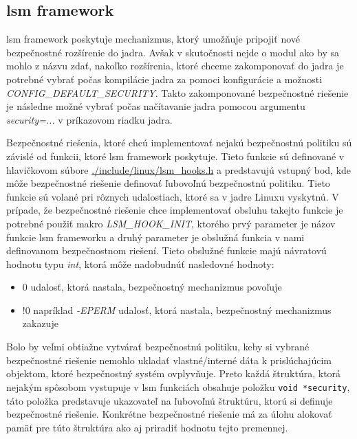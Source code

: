 \subsection{\acrshort{lsm} framework} \label{lsm}
\acrfull{lsm} framework poskytuje mechanizmus, ktorý umožňuje pripojiť nové bezpečnostné rozšírenie do jadra. Avšak v skutočnosti nejde o modul ako by sa mohlo z názvu zdať, nakoľko rozšírenia, ktoré chceme zakomponovať do jadra je potrebné vybrať počas kompilácie jadra za pomoci konfigurácie a možnosti \textit{CONFIG\_DEFAULT\_SECURITY}. Takto zakomponované bezpečnostné riešenie je následne možné vybrať počas načítavanie jadra pomocou argumentu \textit{security=...} v príkazovom riadku jadra.\cite{lsm}

Bezpečnostné riešenia, ktoré chcú implementovať nejakú bezpečnostnú politiku sú závislé od funkcii, ktoré \acrshort{lsm} framework poskytuje. Tieto funkcie sú definované v hlavičkovom súbore \url{./include/linux/lsm_hooks.h} a predstavujú vstupný bod, kde môže bezpečnostné riešenie definovať ľubovoľnú bezpečnostnú politiku. Tieto funkcie sú volané pri rôznych udalostiach, ktoré sa v jadre Linuxu vyskytnú. V prípade, že bezpečnostné riešenie chce implementovať obsluhu takejto funkcie je potrebné použiť makro \textit{LSM\_HOOK\_INIT}, ktorého prvý parameter je názov funkcie \acrshort{lsm} frameworku a druhý parameter je obslužná funkcia v nami definovanom bezpečnostnom riešení.\cite{medusavilo} Tieto obslužné funkcie majú návratovú hodnotu typu \textit{int}, ktorá môže nadobudnúť nasledovné hodnoty:
\begin{itemize}
\item 0 udalosť, ktorá nastala, bezpečnostný mechanizmus povoľuje
\item !0 napríklad \textit{-EPERM} udalosť, ktorá nastala, bezpečnostný mechanizmus zakazuje
\end{itemize}

Bolo by veľmi obtiažne vytvárať bezpečnostnú politiku, keby si vybrané bezpečnostné riešenie nemohlo ukladať vlastné/interné dáta k prislúchajúcim objektom, ktoré bezpečnostný systém ovplyvňuje. Preto každá štruktúra, ktorá nejakým spôsobom vystupuje v \acrshort{lsm} funkciách obsahuje položku \texttt{void *security}, táto položka predstavuje ukazovateľ na ľubovoľnú štruktúru, ktorú si definuje bezpečnostné riešenie. Konkrétne bezpečnostné riešenie má za úlohu alokovať pamäť pre túto štruktúra ako aj priradiť hodnotu tejto premennej.
